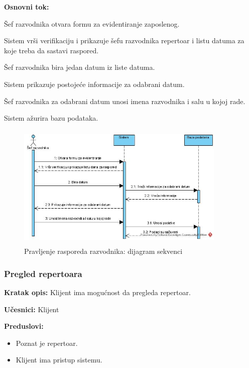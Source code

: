\documentclass[a4paper]{article}
\begin{document}
\noindent\textbf{Osnovni tok:}
  \begin{legal}
    \item Šef razvodnika otvara formu za evidentiranje zaposlenog.
    \item Sistem vrši verifikaciju i prikazuje šefu razvodnika repertoar i listu datuma za koje treba da sastavi raspored.
    \item Šef razvodnika bira jedan datum iz liste datuma.
    \item Sistem prikazuje postojeće informacije za odabrani datum.
    \item Šef razvodnika za odabrani datum unosi imena razvodnika i salu u kojoj rade.
    \item Sistem ažurira bazu podataka.
  \end{legal}

\begin{figure}[H]
  \begin{center}
      \includegraphics[width=100mm,height=60mm]{../images/sequence_raspored_razvodnika.jpg}
  \end{center}
  \caption{Pravljenje rasporeda razvodnika: dijagram sekvenci}
  \label{sequence_raspored_razvodnika}
\end{figure}

\subsubsection{Pregled repertoara} 
\noindent\textbf{Kratak opis:} Klijent ima mogućnost da pregleda repertoar.

\noindent\textbf{Učesnici:} Klijent

\noindent\textbf{Preduslovi:}
  \begin{itemize}
    \item Poznat je repertoar.
    \item Klijent ima pristup sistemu.
  \end{itemize}
\end{document}
